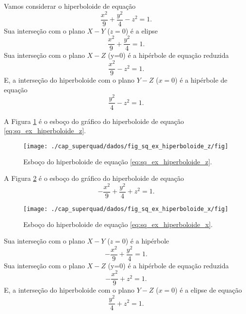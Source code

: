 \begin{ex}
  Vamos considerar o hiperboloide de equação
  \begin{equation}\label{eq:sq_ex_hiperboloide_z}
    \frac{x^2}{9}+\frac{y^2}{4}-z^2=1.
  \end{equation}
  Sua interseção com o plano $X-Y$ ($z=0$) é a elipse
  \begin{equation}
    \frac{x^2}{9}+\frac{y^2}{4}=1.
  \end{equation}
  Sua interseção com o plano $X-Z$ (y=0) é a hipérbole de equação reduzida
  \begin{equation}
    \frac{x^2}{9}-z^2=1.
  \end{equation}
  E, a interseção do hiperboloide com o plano $Y-Z$ ($x=0$) é a hipérbole de equação
  \begin{equation}
    \frac{y^2}{4}-z^2=1.
  \end{equation}
  
  A Figura \ref{fig:sq_ex_hiperboloide_z} é o esboço do gráfico do hiperboloide de equação \eqref{eq:sq_ex_hiperboloide_z}.

    \begin{figure}[H]
    \centering
    \texttt{[image: ./cap\_superquad/dados/fig\_sq\_ex\_hiperboloide\_z/fig]}
    \caption{Esboço do hiperboloide de equação \eqref{eq:sq_ex_hiperboloide_z}.}
    \label{fig:sq_ex_hiperboloide_z}
  \end{figure}
\end{ex}

\begin{ex}
  A Figura \ref{fig:sq_ex_hiperboloide_x} é o esboço do gráfico do hiperboloide de equação
  \begin{equation}\label{eq:sq_ex_hiperboloide_x}
    -\frac{x^2}{9}+\frac{y^2}{4}+z^2=1.
  \end{equation}

  \begin{figure}[H]
    \centering
    \texttt{[image: ./cap\_superquad/dados/fig\_sq\_ex\_hiperboloide\_x/fig]}
    \caption{Esboço do hiperboloide de equação \eqref{eq:sq_ex_hiperboloide_x}.}
    \label{fig:sq_ex_hiperboloide_x}
  \end{figure}
  
  
  Sua interseção com o plano $X-Y$ ($z=0$) é a hipérbole
  \begin{equation}
    -\frac{x^2}{9}+\frac{y^2}{4}=1.
  \end{equation}
  Sua interseção com o plano $X-Z$ (y=0) é a hipérbole de equação reduzida
  \begin{equation}
    -\frac{x^2}{9}+z^2=1.
  \end{equation}
  E, a interseção do hiperboloide com o plano $Y-Z$ ($x=0$) é a elipse de equação
  \begin{equation}
    \frac{y^2}{4}+z^2=1.
  \end{equation}
\end{ex}

